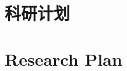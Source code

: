 \ifChinese

\section*{科研计划}

\zhlipsum[4-6]

\else  %

\section*{Research Plan}

\lipsum[4-6]

\fi  %
